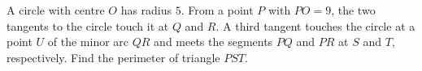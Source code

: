 A circle with centre $O$ has radius $5$. From a point $P$ with $PO=9$, the two tangents to the circle touch it at $Q$ and $R$. A third tangent touches the circle at a point $U$ of the minor arc $QR$ and meets the segments $PQ$ and $PR$ at $S$ and $T$, respectively. Find the perimeter of triangle $PST$.
